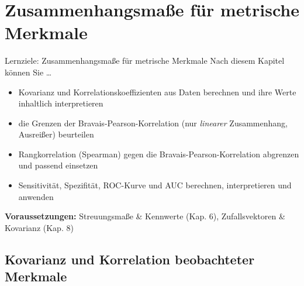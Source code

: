 \documentclass[
  10pt,
  ignorenonframetext,
]{beamer}
\providecommand{\tightlist}{%
  \setlength{\itemsep}{0pt}\setlength{\parskip}{0pt}}
\begin{document}
\hypertarget{zusammenhangsmauxdfe-fuxfcr-metrische-merkmale}{%
\section{Zusammenhangsmaße für metrische
Merkmale}\label{zusammenhangsmauxdfe-fuxfcr-metrische-merkmale}}

\begin{frame}{Lernziele: Zusammenhangsmaße für metrische Merkmale}
\protect\hypertarget{lernziele-zusammenhangsmauxdfe-fuxfcr-metrische-merkmale}{}
Nach diesem Kapitel können Sie \ldots{}

\begin{itemize}
\tightlist
\item
  Kovarianz und Korrelationskoeffizienten aus Daten berechnen und ihre
  Werte inhaltlich interpretieren
\item
  die Grenzen der Bravais-Pearson-Korrelation (nur \emph{linearer}
  Zusammenhang, Ausreißer) beurteilen
\item
  Rangkorrelation (Spearman) gegen die Bravais-Pearson-Korrelation
  abgrenzen und passend einsetzen
\item
  Sensitivität, Spezifität, ROC-Kurve und AUC berechnen, interpretieren
  und anwenden
\end{itemize}

\vspace{1em}

\textbf{Voraussetzungen:} Streuungsmaße \& Kennwerte (Kap. 6),
Zufallsvektoren \& Kovarianz (Kap. 8)
\end{frame}

\hypertarget{kovarianz-und-korrelation-beobachteter-merkmale}{%
\subsection{Kovarianz und Korrelation beobachteter
Merkmale}\label{kovarianz-und-korrelation-beobachteter-merkmale}}
\end{document}
